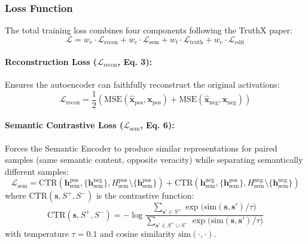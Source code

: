 \subsubsection{Loss Function}

The total training loss combines four components following the TruthX paper:
\begin{equation}
\label{eq:truthx_loss}
\mathcal{L} = w_r \cdot \mathcal{L}_{\mathrm{recon}} + w_c \cdot \mathcal{L}_{\mathrm{sem}} + w_t \cdot \mathcal{L}_{\mathrm{truth}} + w_e \cdot \mathcal{L}_{\mathrm{edit}}
\end{equation}

\paragraph{Reconstruction Loss ($\mathcal{L}_{\mathrm{recon}}$, Eq. 3):}
Ensures the autoencoder can faithfully reconstruct the original activations:
\begin{equation}
\label{eq:truthx_recon_loss}
\mathcal{L}_{\mathrm{recon}} = \frac{1}{2} \left( \mathrm{MSE}(\hat{\mathbf{x}}_{\mathrm{pos}}, \mathbf{x}_{\mathrm{pos}}) + \mathrm{MSE}(\hat{\mathbf{x}}_{\mathrm{neg}}, \mathbf{x}_{\mathrm{neg}}) \right)
\end{equation}

\paragraph{Semantic Contrastive Loss ($\mathcal{L}_{\mathrm{sem}}$, Eq. 6):}
Forces the Semantic Encoder to produce similar representations for paired samples (same semantic content, opposite veracity) while separating semantically different samples:
\begin{equation}
\label{eq:truthx_sem_loss}
\mathcal{L}_{\mathrm{sem}} = \mathrm{CTR}(\mathbf{h}_{\mathrm{sem}}^{\mathrm{pos}}, \{\mathbf{h}_{\mathrm{sem}}^{\mathrm{neg}}\}, H_{\mathrm{sem}}^{\mathrm{pos}} \setminus \{\mathbf{h}_{\mathrm{sem}}^{\mathrm{pos}}\}) + \mathrm{CTR}(\mathbf{h}_{\mathrm{sem}}^{\mathrm{neg}}, \{\mathbf{h}_{\mathrm{sem}}^{\mathrm{pos}}\}, H_{\mathrm{sem}}^{\mathrm{neg}} \setminus \{\mathbf{h}_{\mathrm{sem}}^{\mathrm{neg}}\})
\end{equation}
where $\mathrm{CTR}(\mathbf{s}, S^+, S^-)$ is the contrastive function:
\begin{equation}
\label{eq:ctr_function}
\mathrm{CTR}(\mathbf{s}, S^+, S^-) = -\log \frac{\sum_{\mathbf{s}' \in S^+} \exp\!\big(\mathrm{sim}(\mathbf{s}, \mathbf{s}') / \tau\big)}{\sum_{\mathbf{s}' \in S^+ \cup S^-} \exp\!\big(\mathrm{sim}(\mathbf{s}, \mathbf{s}') / \tau\big)}
\end{equation}
with temperature $\tau = 0.1$ and cosine similarity $\mathrm{sim}(\cdot, \cdot)$.

